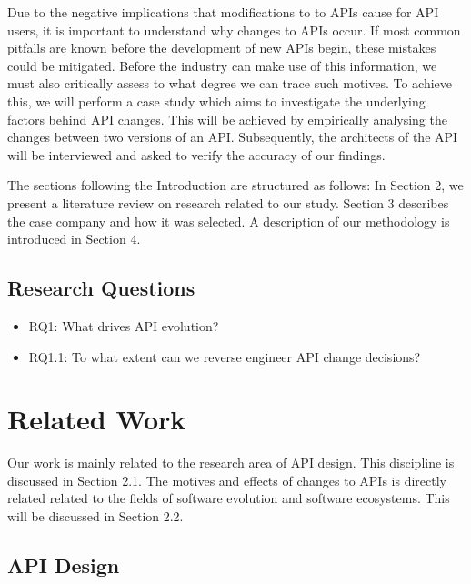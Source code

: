 \documentclass[10pt,twocolumn]{article}
\begin{document}
Due to the negative implications that modifications to to APIs cause for API users, it is important to understand why changes to APIs occur. If most common pitfalls are known before the development of new APIs begin, these mistakes could be mitigated. Before the industry can make use of this information, we must also critically assess to what degree we can trace such motives. To achieve this, we will perform a case study which aims to investigate the underlying factors behind API changes. This will be achieved by empirically analysing the changes between two versions of an API. Subsequently, the architects of the API will be interviewed and asked to verify the accuracy of our findings. 

The sections following the Introduction are structured as follows: In Section 2, we present a literature review on research related to our study. Section 3 describes the case company and how it was selected. A description of our methodology is introduced in Section 4. 

\subsection{Research Questions}
\begin{itemize}
\item RQ1: What drives API evolution? 
\item RQ1.1: To what extent can we reverse engineer API change decisions?
\end{itemize}


\section{Related Work}
Our work is mainly related to the research area of API design. This discipline is discussed in Section 2.1. The motives and effects of changes to APIs is directly related related to the fields of software evolution and software ecosystems. This will be discussed in Section 2.2. 

\subsection{API Design}
\end{document}
